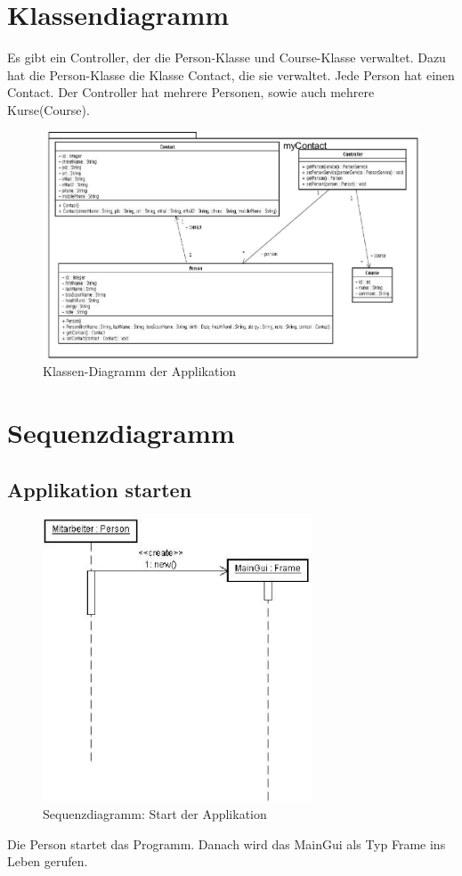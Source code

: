 \section{Klassendiagramm}
Es gibt ein Controller, der die Person-Klasse und Course-Klasse verwaltet. Dazu hat die
Person-Klasse die Klasse Contact, die sie verwaltet. Jede Person hat einen Contact.
Der Controller hat mehrere Personen, sowie auch mehrere Kurse(Course).
%
\begin{figure}[ht]
\begin{center}
\includegraphics[width=15cm]{images/classDiagramm.png}
\caption{Klassen-Diagramm der Applikation}
\end{center}
\end{figure}
%
\clearpage
\section{Sequenzdiagramm}
\subsection{Applikation starten}
\begin{figure}[ht]
\begin{center}
\includegraphics[width=8cm]{images/startApplication.png}
\caption{Sequenzdiagramm: Start der Applikation}
\end{center}
\end{figure}
Die Person startet das Programm. Danach wird das MainGui als Typ Frame ins Leben
gerufen.
%
\clearpage
